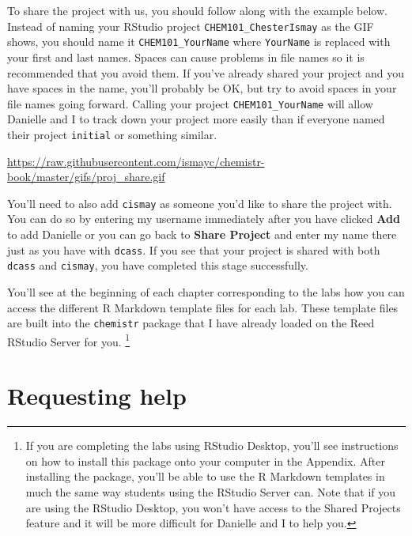\documentclass[]{tufte-book}
\begin{document}
To share the project with us, you should follow along with the example
below. Instead of naming your RStudio project
\texttt{CHEM101\_ChesterIsmay} as the GIF shows, you should name it
\texttt{CHEM101\_YourName} where \texttt{YourName} is replaced with your
first and last names. Spaces can cause problems in file names so it is
recommended that you avoid them. If you've already shared your project
and you have spaces in the name, you'll probably be OK, but try to avoid
spaces in your file names going forward. Calling your project
\texttt{CHEM101\_YourName} will allow Danielle and I to track down your
project more easily than if everyone named their project
\texttt{initial} or something similar.

\vspace{0.1in}

\begin{center}\footnotesize{\url{https://raw.githubusercontent.com/ismayc/chemistr-book/master/gifs/proj_share.gif}}\end{center}

\vspace{0.1in}

You'll need to also add \texttt{cismay} as someone you'd like to share
the project with. You can do so by entering my username immediately
after you have clicked \textbf{Add} to add Danielle or you can go back
to \textbf{Share Project} and enter my name there just as you have with
\texttt{dcass}. If you see that your project is shared with both
\texttt{dcass} and \texttt{cismay}, you have completed this stage
successfully.

You'll see at the beginning of each chapter corresponding to the labs
how you can access the different R Markdown template files for each lab.
These template files are built into the \texttt{chemistr} package that I
have already loaded on the Reed RStudio Server for you. \footnote{If you
  are completing the labs using RStudio Desktop, you'll see instructions
  on how to install this package onto your computer in the Appendix.
  After installing the package, you'll be able to use the R Markdown
  templates in much the same way students using the RStudio Server can.
  Note that if you are using the RStudio Desktop, you won't have access
  to the Shared Projects feature and it will be more difficult for
  Danielle and I to help you.}

\section*{Requesting help}\label{requesting-help}
\end{document}
